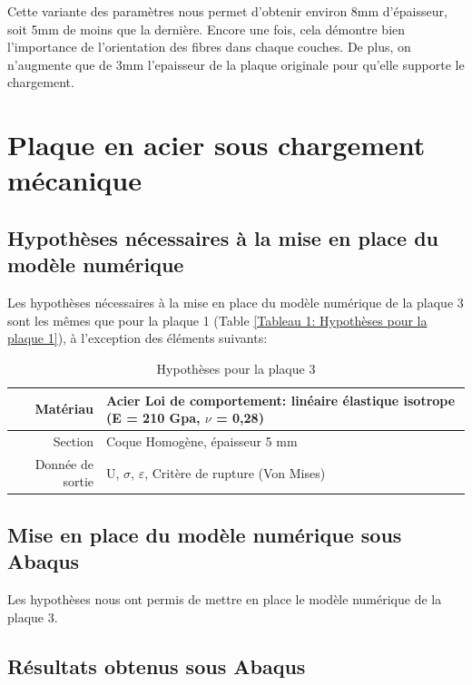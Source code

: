 \documentclass[a4paper,12pt]{article}
\begin{document}
Cette variante des paramètres nous permet d'obtenir environ 8mm d'épaisseur, soit 5mm de moins que la dernière. Encore une fois, cela démontre bien l'importance de l'orientation des fibres dans chaque couches. De plus, on n'augmente que de 3mm l'epaisseur de la plaque originale pour qu'elle supporte le chargement.


\section{Plaque en acier sous chargement mécanique}
\subsection{Hypothèses nécessaires à la mise en place du modèle numérique}
Les hypothèses nécessaires à la mise en place du modèle numérique de la plaque 3 sont les mêmes que pour la plaque 1 (Table \ref{Tableau 1: Hypothèses pour la plaque 1}), à l'exception des éléments suivants:

\begin{table}[h!]
	\centering
	\renewcommand{\arraystretch}{1.2} %
	\begin{tabular}{r p{10cm}}
		Matériau   & Acier Loi de comportement: linéaire élastique isotrope (E = 210 Gpa, $\nu$ = 0,28)\\
		\hline

		Section   & Coque Homogène, épaisseur 5 mm\\
		\hline
		Donnée de sortie   & U, $\sigma$, $\varepsilon$, Critère de rupture (Von Mises) \\
	\end{tabular}
	\caption{Hypothèses pour la plaque 3}
	\label{Tableau 1: Hypothèses pour la plaque 3}
\end{table}

\subsection{Mise en place du modèle numérique sous Abaqus}
Les hypothèses nous ont permis de mettre en place le modèle numérique de la plaque 3.

\subsection{Résultats obtenus sous Abaqus}
\end{document}
